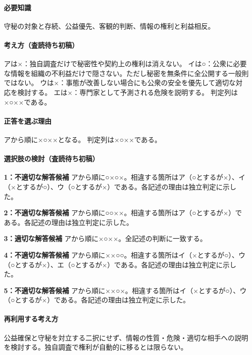 \paragraph{必要知識} 守秘の対象と存続、公益優先、客観的判断、情報の権利と利益相反。

\paragraph{考え方（査読待ち初稿）} アは×：独自調査だけで秘密性や契約上の権利は消えない。 イは○：公衆に必要な情報を組織の不利益だけで隠さない。ただし秘密を無条件に全公開する一般則ではない。 ウは×：事態が改善しない場合にも公衆の安全を優先して適切な対応を検討する。 エは×：専門家として予測される危険を説明する。 判定列は×○××である。

\paragraph{正答を選ぶ理由} アから順に×○××となる。  判定列は×○××である。

\paragraph{選択肢の検討（査読待ち初稿）}

\noindent\textbf{1：不適切な解答候補} アから順に○×○×。相違する箇所はア（○とするが×）、イ（×とするが○）、ウ（○とするが×）である。各記述の理由は独立判定に示した。\par

\noindent\textbf{2：不適切な解答候補} アから順に○○××。相違する箇所はア（○とするが×）である。各記述の理由は独立判定に示した。\par

\noindent\textbf{3：適切な解答候補} アから順に×○××。全記述の判断に一致する。\par

\noindent\textbf{4：不適切な解答候補} アから順に××○○。相違する箇所はイ（×とするが○）、ウ（○とするが×）、エ（○とするが×）である。各記述の理由は独立判定に示した。\par

\noindent\textbf{5：不適切な解答候補} アから順に××○×。相違する箇所はイ（×とするが○）、ウ（○とするが×）である。各記述の理由は独立判定に示した。\par

\paragraph{再利用する考え方} 公益確保と守秘を対立する二択にせず、情報の性質・危険・適切な相手への説明を検討する。独自調査で権利が自動的に移るとは限らない。

